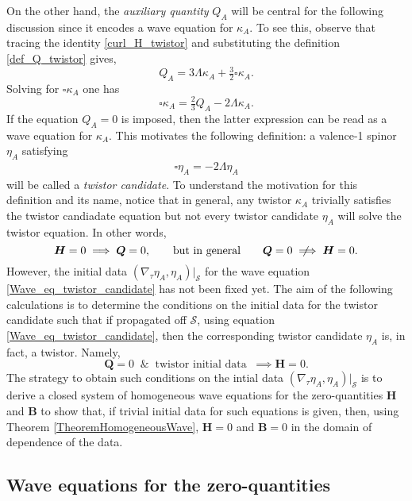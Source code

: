 \documentclass[10pt,a4paper]{article}
\theoremstyle{plain}
\def\bmB{{\bm B}}
\def\bmH{{\bm H}}
\def\bmQ{{\bm Q}}
\newcommand{\notimplies}{%
  \mathrel{{\ooalign{\hidewidth$\not\phantom{=}$\hidewidth\cr$\implies$}}}}
\begin{document}
{  On the other hand, the \emph{auxiliary quantity}
  $Q_A$ will be central for the following discussion since it
  encodes a wave equation for $\kappa_A$. To see this, observe that
  tracing the identity \eqref{curl_H_twistor} and substituting the
  definition \eqref{def_Q_twistor} gives,
\begin{equation}\label{Q_to_box_twistor_candidate}
Q_{A} = 3 \Lambda \kappa _{A} + \tfrac{3}{2} \square \kappa _{A}.
\end{equation}
Solving for $\square \kappa _{A}$ one has
\[
\square \kappa _{A} = \tfrac{2}{3} Q_{A} -2 \Lambda \kappa _{A}.
\]
If the equation $Q_{A}=0$ is imposed, then
the latter expression can be read as a wave equation for $\kappa_A$.
This motivates the following definition: a valence-1 spinor $\eta_A$ satisfying
\begin{align} \label{Wave_eq_twistor_candidate}
\square \eta _{A} = -2 \Lambda  \eta _{A}
\end{align}
will be called a \emph{twistor candidate}. To understand the
motivation for this definition and its name, notice that in general,
any twistor $\kappa_A$ trivially satisfies the twistor candiadate
equation but not every twistor candidate $\eta_A$ will solve the
twistor equation. In other words,
\[
\bmH=0 \implies \bmQ =0, \qquad \text{but in general} \qquad \bmQ =0 \notimplies \bmH=0.
\]
However,  the initial data $(\nabla_\tau
\eta_A, \eta_A)|_{\mathcal{S}}$ for the wave equation
\eqref{Wave_eq_twistor_candidate} has not been fixed yet. The aim of the following
calculations is to determine the conditions on the initial data for the
twistor candidate such that if propagated off $\mathcal{S}$, using
equation \eqref{Wave_eq_twistor_candidate}, then the corresponding twistor
candidate $\eta_A$ is, in fact, a twistor. Namely,
\begin{equation}
\bmQ =0 \;\;\&\;\; \text{twistor initial data} \;\;\implies \bmH=0.
\end{equation}
The strategy to obtain such conditions on the intial data
$(\nabla_\tau \eta_A, \eta_A)|_{\mathcal{S}}$  is to derive a closed
system of homogeneous wave equations for the zero-quantities $\bmH$
and $\bmB$ to show that, if trivial initial data for such
equations is given, then, using Theorem \ref{TheoremHomogeneousWave},
$\bmH=0$ and $\bmB=0$ in the domain of dependence of the data.

\subsection{Wave equations for the zero-quantities}

}
\end{document}
